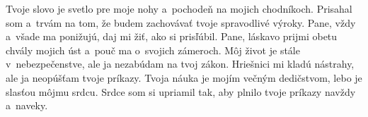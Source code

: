 Tvoje slovo je svetlo pre moje nohy
a~pochodeň na mojich chodníkoch.
\versseparator
Prisahal som a~trvám na tom,
že budem zachovávať tvoje spravodlivé výroky.
\versseparator
Pane, vždy a~všade ma ponižujú,
daj mi žiť, ako si prisľúbil.
\versseparator
Pane, láskavo prijmi obetu chvály mojich úst
a~pouč ma o~svojich zámeroch.
\versseparator
Môj život je stále v~nebezpečenstve,
ale ja nezabúdam na tvoj zákon.
\versseparator
Hriešnici mi kladú nástrahy,
ale ja neopúšťam tvoje príkazy.
\versseparator
Tvoja náuka je mojím večným dedičstvom,
lebo je slasťou môjmu srdcu.
\versseparator
Srdce som si upriamil tak, aby plnilo tvoje príkazy
navždy a~naveky.